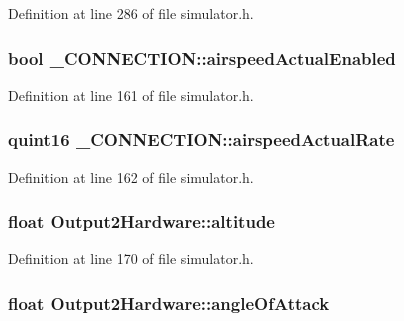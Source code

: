 \-Definition at line 286 of file simulator.\-h.

\hypertarget{group___h_i_t_l_plugin_ga8fc341e96193fe41625a04a534a16387}{
\subsubsection[{airspeed\-Actual\-Enabled}]{\setlength{\rightskip}{0pt plus 5cm}bool {\bf \-\_\-\-C\-O\-N\-N\-E\-C\-T\-I\-O\-N\-::airspeed\-Actual\-Enabled}}}\label{group___h_i_t_l_plugin_ga8fc341e96193fe41625a04a534a16387}


\-Definition at line 161 of file simulator.\-h.

\hypertarget{group___h_i_t_l_plugin_gacb3c852192e75845b2a17679c94a10c1}{
\subsubsection[{airspeed\-Actual\-Rate}]{\setlength{\rightskip}{0pt plus 5cm}quint16 {\bf \-\_\-\-C\-O\-N\-N\-E\-C\-T\-I\-O\-N\-::airspeed\-Actual\-Rate}}}\label{group___h_i_t_l_plugin_gacb3c852192e75845b2a17679c94a10c1}


\-Definition at line 162 of file simulator.\-h.

\hypertarget{group___h_i_t_l_plugin_gafbb52a0b15f16cac6f1efbcae3702e96}{
\subsubsection[{altitude}]{\setlength{\rightskip}{0pt plus 5cm}float {\bf \-Output2\-Hardware\-::altitude}}}\label{group___h_i_t_l_plugin_gafbb52a0b15f16cac6f1efbcae3702e96}


\-Definition at line 170 of file simulator.\-h.

\hypertarget{group___h_i_t_l_plugin_gaa698baa5c5eb08252558e7821e3d48dd}{
\subsubsection[{angle\-Of\-Attack}]{\setlength{\rightskip}{0pt plus 5cm}float {\bf \-Output2\-Hardware\-::angle\-Of\-Attack}}}\label{group___h_i_t_l_plugin_gaa698baa5c5eb08252558e7821e3d48dd}


